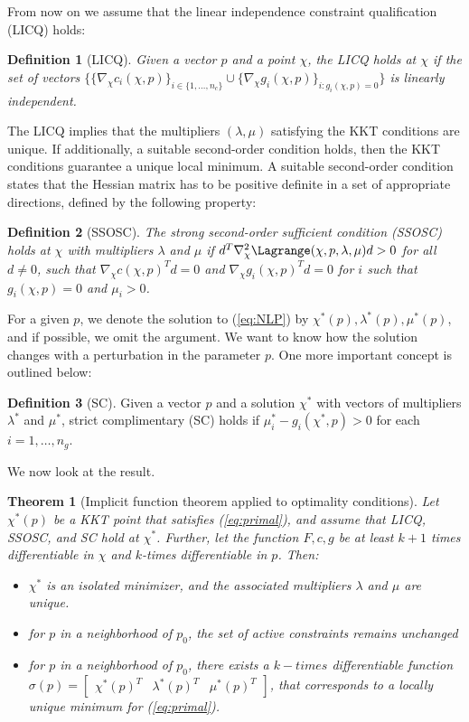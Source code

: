 \documentclass{article}
\newtheorem{theorem}{Theorem}[section]
\theoremstyle{example}
\theoremstyle{definition}
\newtheorem{definition}{Definition}[section]
\theoremstyle{assumption}
\theoremstyle{lemma}
\begin{document}
	From now on we assume that the linear independence constraint qualification (LICQ) holds:
	\begin{definition}[LICQ]
		\textit{Given a vector $p$ and a point $\chi$, the LICQ holds at $\chi$ if the set of vectors $\{\{\nabla_\chi c_i(\chi,p)\}_{i\in\{1,\ldots,n_c\}}\cup\{\nabla_{\chi}g_i(\chi,p)\}_{i:g_i(\chi,p)=0}\}$ is linearly independent.}
	\end{definition}
	\par
	The LICQ implies that the multipliers $(\lambda,\mu)$ satisfying the KKT conditions are unique.
	If additionally, a suitable second-order condition holds, then the KKT conditions guarantee a unique local minimum.
	A suitable second-order condition states that the Hessian matrix has to be positive definite in a set of appropriate directions, defined by the following property:
	\begin{definition}[SSOSC]
		\textit{The strong second-order sufficient condition (SSOSC) holds at $\chi$ with multipliers $\lambda$ and $\mu$ if $d^T\nabla_\chi^2\Lagrange(\chi,p,\lambda,\mu)d>0$ for all $d\neq0$, such that $\nabla_\chi c(\chi,p)^Td=0$ and $\nabla_\chi g_i(\chi,p)^Td=0$ for $i$ such that $g_i(\chi,p)=0$ and $\mu_i>0$.
		}
	\end{definition}
	\par
	For a given $p$, we denote the solution to (\ref{eq:NLP}) by $\chi^*(p),\lambda^*(p),\mu^*(p)$, and if possible, we omit the argument.
	We want to know how the solution changes with a perturbation in the parameter $p$.
	One more important concept is outlined below:
	\begin{definition}[SC]
		Given a vector $p$ and a solution $\chi^*$ with vectors of multipliers $\lambda^*$ and $\mu^*$, strict complimentary (SC) holds if $\mu_i^*-g_i(\chi^*,p)>0$ for each $i=1,\ldots,n_g$.
	\end{definition}
	We now look at the result.
	\begin{theorem}[Implicit function theorem applied to optimality conditions]
		Let $\chi^*(p)$ be a KKT point that satisfies (\ref{eq:primal}), and assume that LICQ, SSOSC, and SC hold at $\chi^*$.
		Further, let the function $F,c,g$ be at least $k+1$ times differentiable in $\chi$ and $k$-times differentiable in $p$. Then:
		\begin{itemize}
			\item $\chi^*$ is an isolated minimizer, and the associated multipliers $\lambda$ and $\mu$ are unique.
			\item for $p$ in a neighborhood of $p_0$, the set of active constraints remains unchanged
			\item for $p$ in a neighborhood of $p_0$, there exists a $k-times$ differentiable function $\sigma(p)=\begin{bmatrix}\chi^*(p)^T &\lambda^*(p)^T & \mu^*(p)^T\end{bmatrix}$, that corresponds to a locally unique minimum for (\ref{eq:primal}).
		\end{itemize}
	\end{theorem}
\end{document}
